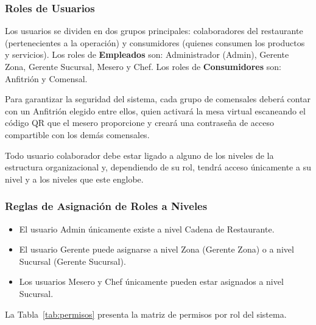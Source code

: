 \subsubsection{Roles de Usuarios}

Los usuarios se dividen en dos grupos principales: colaboradores del restaurante
(pertenecientes a la operación) y consumidores (quienes consumen los productos y
servicios). Los roles de \textbf{Empleados} son: Administrador (Admin),
Gerente Zona, Gerente Sucursal, Mesero y Chef. Los roles de \textbf{Consumidores}
son: Anfitrión y Comensal.

Para garantizar la seguridad del sistema, cada grupo de comensales deberá contar
con un Anfitrión elegido entre ellos, quien activará la mesa virtual escaneando
el código QR que el mesero proporcione y creará una contraseña de acceso compartible
con los demás comensales.

Todo usuario colaborador debe estar ligado a alguno de los niveles de la estructura
organizacional y, dependiendo de su rol, tendrá acceso únicamente a su nivel y a
los niveles que este englobe.

\subsubsection{Reglas de Asignación de Roles a Niveles}

\begin{itemize}[leftmargin=1.5em]
  \item El usuario Admin únicamente existe a nivel Cadena de Restaurante.
  \item El usuario Gerente puede asignarse a nivel Zona (Gerente Zona) o a nivel
        Sucursal (Gerente Sucursal).
  \item Los usuarios Mesero y Chef únicamente pueden estar asignados a nivel Sucursal.
\end{itemize}

La Tabla~\ref{tab:permisos} presenta la matriz de permisos por rol del sistema.

